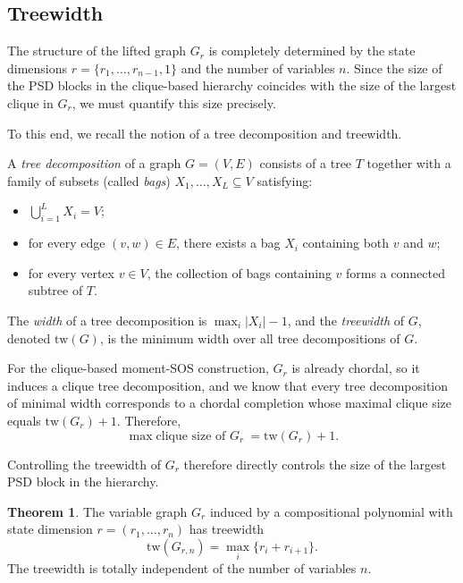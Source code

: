 \documentclass[11pt,a4paper]{article}
\theoremstyle{definition}
\newtheorem{theorem}{Theorem}[section]
\begin{document}
\subsection{Treewidth}

The structure of the lifted graph $G_{r}$ is completely determined by the state dimensions $r=\{r_1,\dots,r_{n-1},1\}$ and the number of variables $n$. Since the size of the PSD blocks in the clique-based hierarchy coincides with the size of the largest clique in $G_{r}$, we must quantify this size precisely.

To this end, we recall the notion of a tree decomposition and treewidth.

A \emph{tree decomposition} of a graph $G=(V,E)$ consists of a tree $T$ together with a family of subsets (called \emph{bags}) $X_1,\dots,X_L \subseteq V$ satisfying: 
\begin{itemize}
    \item $\bigcup_{i=1}^L X_i = V$;
    \item for every edge $(v,w)\in E$, there exists a bag $X_i$ containing both $v$ and $w$;
    \item for every vertex $v\in V$, the collection of bags containing $v$ forms a connected subtree of $T$.
\end{itemize}

The \emph{width} of a tree decomposition is $\max_i |X_i|-1$, and the \emph{treewidth} of $G$, denoted $\mathrm{tw}(G)$, is the minimum width over all tree decompositions of $G$.

For the clique-based moment-SOS construction, $G_{r}$ is already chordal, so it induces a clique tree decomposition, and we know that every tree decomposition of minimal width corresponds to a chordal completion whose maximal clique size equals $\mathrm{tw}(G_{r})+1$. Therefore,
\[
\max \text{clique size of } G_{r}\
=
\mathrm{tw}(G_{r})+1.
\]

Controlling the treewidth of $G_{r}$ therefore directly controls the
size of the largest PSD block in the hierarchy.

\begin{theorem}
    The variable graph $G_{r}$ induced by a compositional polynomial with state dimension $r=(r_1,\dots,r_n)$ has treewidth
    \[
    \mathrm{tw}(G_{r,n})=\max_i\{r_i+r_{i+1}\}.
    \]
    The treewidth is totally independent of the number of variables $n$.
    \label{TW}
\end{theorem}
\end{document}
